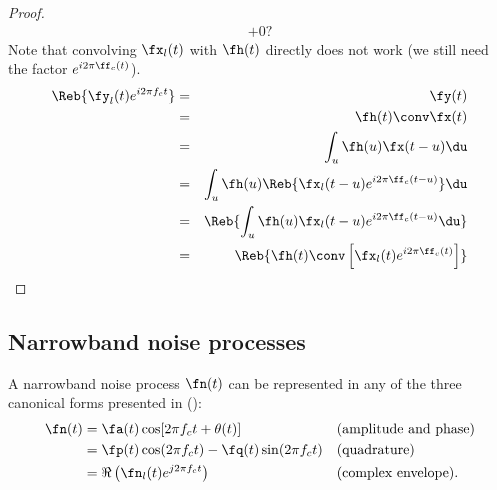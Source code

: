 \begin{proof}
\begin{eqnarray*}
        + 0 ?
\end{eqnarray*}
\attention
Note that convolving $\fx_l(t)$ with $\fh(t)$ directly does
not work (we still need the factor $e^{i2\pi \ff_c(t)}$).
\begin{eqnarray*}
   \Reb{ \fy_l(t)e^{i2\pi f_ct}}
     &=& \fy(t)
   \\&=& \fh(t) \conv \fx(t)
   \\&=& \int_u \fh(u)\fx(t-u)\du
   \\&=& \int_u \fh(u)
                \Reb{ \fx_l(t-u)e^{i2\pi \ff_c(t-u)}} \du
   \\&=& \Reb{ \int_u \fh(u)
                \fx_l(t-u)e^{i2\pi \ff_c(t-u)} \du }
   \\&=& \Reb{ \fh(t)\conv\left[\fx_l(t)e^{i2\pi \ff_c(t)}\right]}
\end{eqnarray*}
\end{proof}



\subsection{Narrowband noise processes}
A narrowband noise process $\fn(t)$ can be represented in any of the
three canonical forms presented in 
():
\begin{align*}
   \fn(t)
     &= \fa(t)\cos[2\pi f_ct + \theta(t)]              
     && \text{(amplitude and phase)}
   \\&= \fp(t)\cos(2\pi f_ct) - \fq(t) \sin(2\pi f_c t)  
     && \text{(quadrature)}
   \\&= \Re\left(\fn_l(t)e^{j2\pi f_ct}\right)                 
     && \text{(complex envelope).}
\end{align*}



